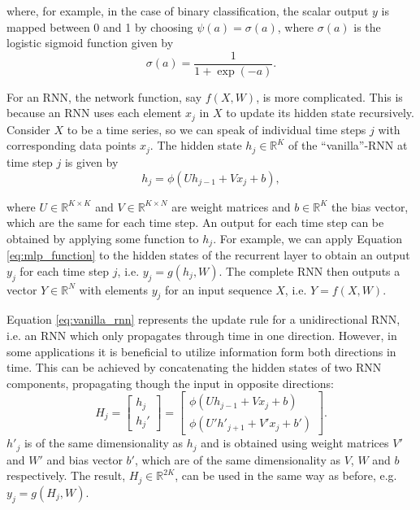 \noindent where, for example, in the case of binary classification, the scalar output $y$ is mapped between 0 and 1 by choosing 
$\psi(a) = \sigma(a)$, where $\sigma(a)$ is the logistic sigmoid function given by
\begin{equation}
    \sigma(a) = \frac{1}{1+\exp(-a)}.
\end{equation}

For an RNN, the network function, say $f(X,W)$, is more complicated. This is because an RNN uses each element $x_j$ in $X$ to update its hidden state recursively. Consider $X$ to be a time series, so we can speak of individual time steps $j$ with corresponding data points $x_j$. The hidden state $h_{j} \in \mathbb{R}^K$ of the ``vanilla''-RNN at time step $j$ is given by
\begin{equation}
    \label{eq:vanilla_rnn}
    h_{j} = \phi(U h_{j-1} + V x_j + b),
\end{equation}

\noindent where $U \in \mathbb{R}^{K \times K}$ and $V \in \mathbb{R}^{K \times N}$ are weight matrices and $b \in \mathbb{R}^{K}$ the bias vector, which are the same for each time step. An output for each time step can be obtained by applying some function to $h_{j}$. For example, we can apply Equation \ref{eq:mlp_function} to the hidden states of the recurrent layer to obtain an output $y_j$ for each time step $j$, i.e. $y_j= g(h_{j}, W)$. The complete RNN then outputs a vector $Y \in \mathbb{R}^N$ with elements $y_j$ for an input sequence $X$, i.e. $Y = f(X, W)$.

Equation \ref{eq:vanilla_rnn} represents the update rule for a unidirectional RNN, i.e. an RNN which only propagates through time in one direction. However, in some applications it is beneficial to utilize information form both directions in time. This can be achieved by concatenating the hidden states of two RNN components, propagating though the input in opposite directions:
\begin{equation}
    H_j =  
    \begin{bmatrix}
        h_j \\
        h_j'
    \end{bmatrix} =
    \begin{bmatrix}
        \phi(U h_{j-1} + V x_j + b) \\
        \phi(U' h'_{j+1} + V' x_j + b')
    \end{bmatrix}.
\end{equation}
$h'_j$ is of the same dimensionality as $h_j$ and is obtained using weight matrices $V'$ and $W'$ and bias vector $b'$, which are of the same dimensionality as $V$, $W$ and $b$ respectively. The result, $H_j \in \mathbb{R}^{2K}$, can be used in the same way as before, e.g. $y_j= g(H_{j}, W)$.

